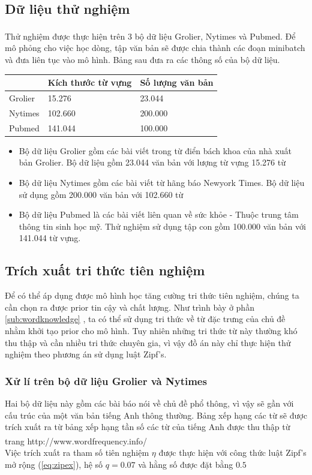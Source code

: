 \documentclass[fontsize=13pt]{scrartcl}
\begin{document}
\subsection{Dữ liệu thử nghiệm}
Thử nghiệm được thực hiện trên 3 bộ dữ liệu Grolier, Nytimes và Pubmed\textsuperscript{\cite{dataset}}. Để mô phỏng cho việc học dòng, tập văn bản sẽ được chia thành các đoạn minibatch và đưa liên tục vào mô hình. Bảng sau đưa ra các thông số của bộ dữ liệu.
\begin{table}[H]
\begin{center}
\begin{tabular}{|l|l|l|}
\hline
& Kích thước từ vựng & Số lượng văn bản \\
\hline
Grolier & 15.276 & 23.044\\
\hline
Nytimes & 102.660 & 200.000 \\
\hline
Pubmed & 141.044 & 100.000\\
\hline 
\end{tabular}
\end{center}
\end{table}
\begin{itemize}
\item Bộ dữ liệu Grolier gồm các bài viết trong từ điển bách khoa của nhà xuất bản Grolier. Bộ dữ liệu gồm 23.044 văn bản với lượng từ vựng 15.276 từ
\item Bộ dữ liệu Nytimes gồm các bài viết từ hãng báo Newyork Times. Bộ dữ liệu sử dụng gồm 200.000 văn bản với 102.660 từ
\item Bộ dữ liệu Pubmed là các bài viết liên quan về sức khỏe - Thuộc trung tâm thông tin sinh học mỹ. Thử nghiệm sử dụng tập con gồm 100.000 văn bản với 141.044 từ vựng.
\end{itemize}
\subsection{Trích xuất tri thức tiên nghiệm}
Để có thể áp dụng được mô hình học tăng cường tri thức tiên nghiệm, chúng ta cần chọn ra được prior tin cậy và chất lượng. Như trình bày ở phần \ref{sub:wordknowledge} , ta có thể sử dụng tri thức về từ đặc trưng của chủ đề nhằm khởi tạo prior cho mô hình. Tuy nhiên những tri thức từ này thường khó thu thập và cần nhiều tri thức chuyên gia, vì vậy đồ án này chỉ thực hiện thử nghiệm theo phương án sử dụng luật Zipf's.
\subsubsection{Xử lí trên bộ dữ liệu Grolier và Nytimes}
Hai bộ dữ liệu này gồm các bài báo nói về chủ đề phổ thông, vì vậy sẽ gần với cấu trúc của một văn bản tiếng Anh thông thường. Bảng xếp hạng các từ sẽ được trích xuất ra từ bảng xếp hạng tần số các từ của tiếng Anh được thu thập từ trang http://www.wordfrequency.info/\textsuperscript{\cite{listfrequencyword}} \\
Việc trích xuất ra tham số tiên nghiệm $\eta$ được thực hiện với công thức luật Zipf's mở rộng (\ref{eq:zipex}), hệ số $q = 0.07$ và hằng số được đặt bằng $0.5$
\end{document}
